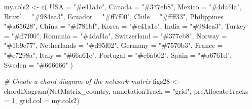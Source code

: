 \documentclass[
]{article}
\newenvironment{Shaded}{\begin{snugshade}}{\end{snugshade}}
\newcommand{\AttributeTok}[1]{\textcolor[rgb]{0.77,0.63,0.00}{#1}}
\newcommand{\CommentTok}[1]{\textcolor[rgb]{0.56,0.35,0.01}{\textit{#1}}}
\newcommand{\DecValTok}[1]{\textcolor[rgb]{0.00,0.00,0.81}{#1}}
\newcommand{\FunctionTok}[1]{\textcolor[rgb]{0.00,0.00,0.00}{#1}}
\newcommand{\NormalTok}[1]{#1}
\newcommand{\OtherTok}[1]{\textcolor[rgb]{0.56,0.35,0.01}{#1}}
\newcommand{\StringTok}[1]{\textcolor[rgb]{0.31,0.60,0.02}{#1}}
\begin{document}
\begin{Shaded}
\begin{Highlighting}[]
\NormalTok{my.cols2 }\OtherTok{\textless{}{-}} \FunctionTok{c}\NormalTok{(}
  \AttributeTok{USA =} \StringTok{"\#e41a1c"}\NormalTok{,}
  \AttributeTok{Canada =} \StringTok{"\#377eb8"}\NormalTok{,}
  \AttributeTok{Mexico =} \StringTok{"\#4daf4a"}\NormalTok{,}
  \AttributeTok{Brazil =} \StringTok{"\#984ea3"}\NormalTok{,}
  \AttributeTok{Ecuador =} \StringTok{"\#ff7f00"}\NormalTok{,}
  \AttributeTok{Chile =} \StringTok{"\#ffff33"}\NormalTok{,}
  \AttributeTok{Philippines =} \StringTok{"\#a65628"}\NormalTok{,}
  \AttributeTok{China =} \StringTok{"\#f781bf"}\NormalTok{,}
  \AttributeTok{Korea =} \StringTok{"\#e41a1c"}\NormalTok{,}
  \AttributeTok{India =} \StringTok{"\#984ea3"}\NormalTok{,}
  \AttributeTok{Turkey =} \StringTok{"\#ff7f00"}\NormalTok{,}
  \AttributeTok{Romania =} \StringTok{"\#4daf4a"}\NormalTok{,}
  \AttributeTok{Switzerland =} \StringTok{"\#377eb8"}\NormalTok{,}
  \AttributeTok{Norway =} \StringTok{"\#1b9e77"}\NormalTok{,}
  \AttributeTok{Netherlands =} \StringTok{"\#d95f02"}\NormalTok{,}
  \AttributeTok{Germany =} \StringTok{"\#7570b3"}\NormalTok{,}
  \AttributeTok{France =} \StringTok{"\#e7298a"}\NormalTok{,}
  \AttributeTok{Italy =} \StringTok{"\#66a61e"}\NormalTok{,}
  \AttributeTok{Portugal =} \StringTok{"\#e6ab02"}\NormalTok{,}
  \AttributeTok{Spain =} \StringTok{"\#a6761d"}\NormalTok{,}
  \AttributeTok{Sweden =} \StringTok{"\#666666"}
\NormalTok{)}

 

\CommentTok{\# Create a chord diagram of the network matrix}
\NormalTok{figs28 }\OtherTok{\textless{}{-}} \FunctionTok{chordDiagram}\NormalTok{(NetMatrix\_country, }\AttributeTok{annotationTrack =} \StringTok{"grid"}\NormalTok{, }\AttributeTok{preAllocateTracks =} \DecValTok{1}\NormalTok{, }\AttributeTok{grid.col =}\NormalTok{ my.cols2)}


\end{Highlighting}
\end{Shaded}
\end{document}
